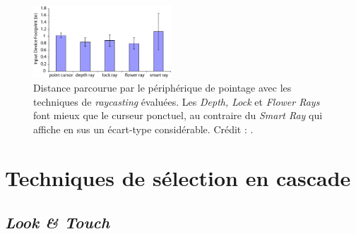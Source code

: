 \begin{appendices}
	\begin{figure}[!htbp]
		\centering
		\includegraphics[width=0.46\textwidth]{figures/ch2/rayFootprint}
		\caption[\emph{Raycasting} et désambiguïsation -- distance parcourue par le périphérique]{Distance parcourue par le périphérique de pointage avec les techniques de \emph{raycasting} évaluées. Les \emph{Depth, Lock} et \emph{Flower Rays} font mieux que le curseur ponctuel, au contraire du \emph{Smart Ray} qui affiche en sus un écart-type considérable. Crédit : \cite{grossman2006design}.}
		\label{fig:rayFootprint}
	\end{figure}



















\FloatBarrier
\section{Techniques de sélection en cascade}

	\subsection{\emph{Look \&{} Touch}}


\end{appendices}
